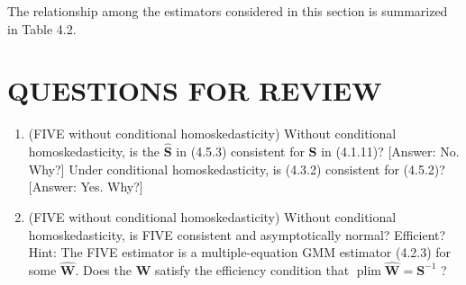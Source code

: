 \documentclass[10pt]{article}
\begin{document}
The relationship among the estimators considered in this section is summarized in Table 4.2.

\section*{QUESTIONS FOR REVIEW}
\begin{enumerate}
  \item (FIVE without conditional homoskedasticity) Without conditional homoskedasticity, is the $\widehat{\mathbf{S}}$ in (4.5.3) consistent for $\mathbf{S}$ in (4.1.11)? [Answer: No. Why?] Under conditional homoskedasticity, is (4.3.2) consistent for (4.5.2)? [Answer: Yes. Why?]
  \item (FIVE without conditional homoskedasticity) Without conditional homoskedasticity, is FIVE consistent and asymptotically normal? Efficient? Hint: The FIVE estimator is a multiple-equation GMM estimator (4.2.3) for some $\widehat{\mathbf{W}}$. Does the $\widehat{\mathbf{W}}$ satisfy the efficiency condition that $\operatorname{plim} \widehat{\mathbf{W}}=\mathbf{S}^{-1}$ ?
\end{enumerate}
\end{document}
